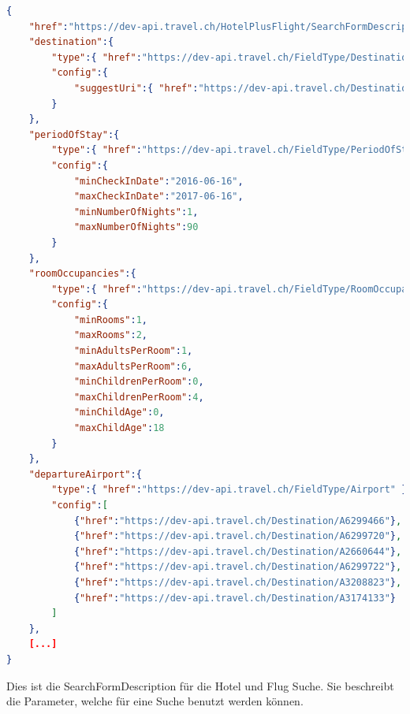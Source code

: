 \begin{lstlisting}[language=json,firstnumber=1]
{
    "href":"https://dev-api.travel.ch/HotelPlusFlight/SearchFormDescription/HotelPlusFligh",
    "destination":{
        "type":{ "href":"https://dev-api.travel.ch/FieldType/Destination" },
        "config":{
            "suggestUri":{ "href":"https://dev-api.travel.ch/DestinationSuggestions/HotelPlusFligh?q=%7B_%7D" }
        }
    },
    "periodOfStay":{
        "type":{ "href":"https://dev-api.travel.ch/FieldType/PeriodOfStay" },
        "config":{
            "minCheckInDate":"2016-06-16",
            "maxCheckInDate":"2017-06-16",
            "minNumberOfNights":1,
            "maxNumberOfNights":90
        }
    },
    "roomOccupancies":{
        "type":{ "href":"https://dev-api.travel.ch/FieldType/RoomOccupancies" },
        "config":{
            "minRooms":1,
            "maxRooms":2,
            "minAdultsPerRoom":1,
            "maxAdultsPerRoom":6,
            "minChildrenPerRoom":0,
            "maxChildrenPerRoom":4,
            "minChildAge":0,
            "maxChildAge":18
        }
    },
    "departureAirport":{
        "type":{ "href":"https://dev-api.travel.ch/FieldType/Airport" },
        "config":[
            {"href":"https://dev-api.travel.ch/Destination/A6299466"},
            {"href":"https://dev-api.travel.ch/Destination/A6299720"},
            {"href":"https://dev-api.travel.ch/Destination/A2660644"},
            {"href":"https://dev-api.travel.ch/Destination/A6299722"},
            {"href":"https://dev-api.travel.ch/Destination/A3208823"},
            {"href":"https://dev-api.travel.ch/Destination/A3174133"}
        ]
    },
    [...]
}
\end{lstlisting}
Dies ist die SearchFormDescription für die Hotel und Flug Suche. Sie beschreibt die Parameter, welche für eine Suche benutzt werden können.

